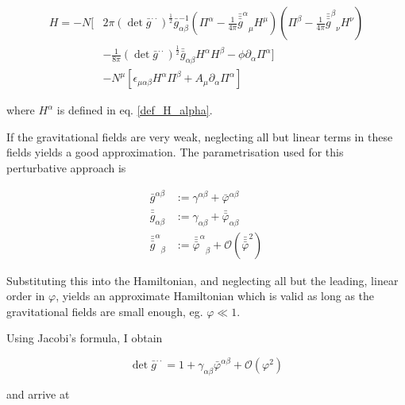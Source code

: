 \documentclass[11pt]{article}
\begin{document}
\begin{equation}
	\begin{split}
		H =
		- N [
		&2 \pi \left( \det{\bar{g}^{\cdot \cdot}}\right)^{\frac{1}{2}}
		\bar{g}^{-1}_{\alpha \beta} 
		\left( 
		\Pi^\alpha 
		- \frac{1}{4 \pi}  {\bar{\bar{\bar{g}}}^\alpha }_\mu H^\mu
		\right)
		\left( 
		\Pi^\beta
		- \frac{1}{4 \pi}  {\bar{\bar{\bar{g}}}^\beta }_\nu H^\nu
		\right) \\
		&- \frac{1}{8 \pi} 
		\left( \det{\bar{g}^{\cdot \cdot}}\right)^{\frac{1}{2}}
		\bar{\bar{g}}_{\alpha \beta} H^\alpha H^\beta 
		- \phi \partial_\alpha \Pi^\alpha
		]\\
		&- N^\mu \left[ 
		\epsilon_{\mu \alpha \beta} H^\alpha \Pi^\beta + A_\mu \partial_\alpha \Pi^\alpha
		\right]
	\end{split}
\end{equation}

where $H^\alpha$ is defined in eq. \ref{def_H_alpha}.

If the gravitational fields are very weak, neglecting all but linear terms in these fields yields a good approximation. The parametrisation used for this perturbative approach is

\begin{align}
	\bar{g}^{\alpha \beta} 
	&:= \gamma^{\alpha \beta} + \bar{\varphi}^{\alpha \beta}\\
	\bar{\bar{g}}_{\alpha \beta}
	&:= \gamma_{\alpha \beta} + \bar{\bar{\varphi}}_{\alpha \beta}\\
	{\bar{\bar{\bar{g}}}^\alpha}_\beta
	&:= {\bar{\bar{\bar{\varphi}}}^\alpha}_\beta
	+ \mathcal{O}\left(
	\bar{\bar{\bar{\varphi}}}^2 
	\right)
\end{align}

Substituting this into the Hamiltonian, and neglecting all but the leading, linear order in $\varphi$, yields an approximate Hamiltonian which is valid as long as the gravitational fields are small enough, eg. $\varphi \ll 1$.

Using Jacobi's formula, I obtain

\begin{equation}
	\det{\bar{g}^{\cdot \cdot}} 
	= 1 + \gamma_{\alpha \beta} \bar{\varphi}^{\alpha \beta}
	+ \mathcal{O} \left( \varphi^2 \right)
\end{equation}

and arrive at
\end{document}
